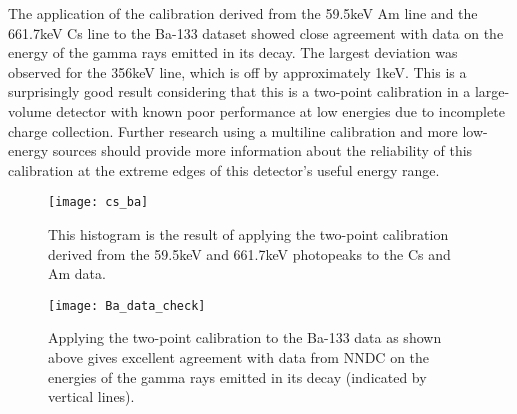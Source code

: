 The application of the calibration derived from the 59.5keV Am line and the
661.7keV Cs line to the Ba-133 dataset showed close agreement with data
on the energy of the gamma rays emitted in its decay.
The largest deviation
was observed for the 356keV line, which is off by approximately 1keV. This is
a surprisingly good result considering that this is a two-point calibration in
a large-volume detector with known poor performance at low energies due to
incomplete charge collection. Further research using a multiline calibration
and more low-energy sources should provide more information about the reliability
of this calibration at the extreme edges of this detector's useful energy range.

\begin{figure}[h]
  \centering
  \texttt{[image: cs\_ba]}
  \caption{This histogram is the result of applying the two-point calibration
  derived from the 59.5keV and 661.7keV photopeaks to the Cs and Am data. }
\label{fig:cesiumamericium}
\end{figure}

\begin{figure}[h]
  \centering
  \texttt{[image: Ba\_data\_check]}
  \caption{Applying the two-point calibration to the Ba-133 data as shown above
  gives excellent agreement with data from NNDC on the energies of the
  gamma rays emitted in its decay (indicated by vertical lines). }
\label{fig:bariumcal}
\end{figure}
